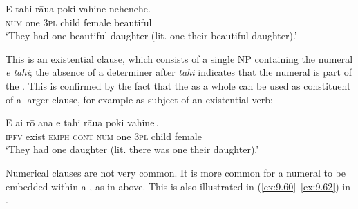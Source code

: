 \ea\label{ex:9.95}
\gll E tahi rāua poki vahine nehenehe. \\
\textsc{num} one \textsc{3pl} child female beautiful \\

\glt
‘They had one beautiful daughter (lit. one their beautiful daughter).’
\z

This is an existential clause, which consists of a single NP containing the numeral \textit{e tahi}; the absence of a determiner after \textit{tahi} indicates that the numeral is part of the . This is confirmed by the fact that the  as a whole can be used as constituent of a larger clause, for example as subject of an existential verb:

\ea\label{ex:9.96}
\gll E ai rō {\ꞌ}ana {\ob}e tahi rāua poki vahine\,{\cb}. \\
\textsc{ipfv} exist \textsc{emph} \textsc{cont} {\db}\textsc{num} one \textsc{3pl} child female \\

\glt 
‘They had one daughter (lit. there was one their daughter).’ \textstyleExampleref{[R338.001 revised]} 
\z

Numerical clauses are not very common. It is more common for a numeral to be embedded within a , as in  above. This is also illustrated in (\ref{ex:9.60}–\ref{ex:9.62}) in . 

